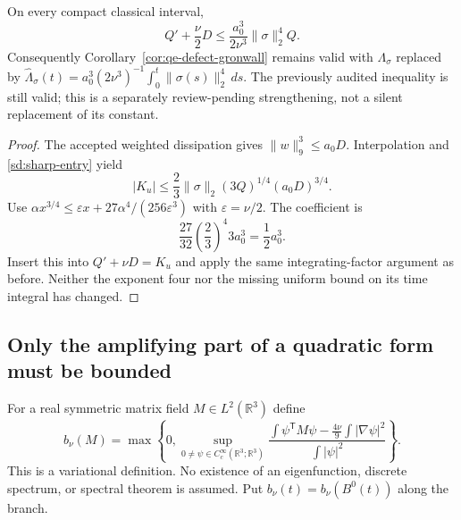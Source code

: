 \begin{proposition}
\label{sd:improved}
On every compact classical interval,
\begin{equation}\label{sd:improved-diff}
 Q'+\frac\nu2D\le\frac{a_0^3}{2\nu^3}\|\sigma\|_2^4Q.
\end{equation}
Consequently Corollary~\ref{cor:qe-defect-gronwall} remains valid with
$\Lambda_\sigma$ replaced by
$\widehat\Lambda_\sigma(t)=a_0^3(2\nu^3)^{-1}
\int_0^t\|\sigma(s)\|_2^4\,ds$.
The previously audited inequality is still valid; this is a separately
review-pending strengthening, not a silent replacement of its constant.
\end{proposition}
\begin{proof}
The accepted weighted dissipation gives $\|w\|_9^3\le a_0D$.
Interpolation and \eqref{sd:sharp-entry} yield
\[
 |K_u|\le\frac23\|\sigma\|_2(3Q)^{1/4}(a_0D)^{3/4}.
\]
Use $\alpha x^{3/4}\le\varepsilon x+
27\alpha^4/(256\varepsilon^3)$ with $\varepsilon=\nu/2$.
The coefficient is
\[
 \frac{27}{32}\left(\frac23\right)^4 3a_0^3
 =\frac12a_0^3.
\]
Insert this into $Q'+\nu D=K_u$ and apply the same integrating-factor
argument as before. Neither the exponent four nor the missing uniform
bound on its time integral has changed.
\end{proof}

\subsection{Only the amplifying part of a quadratic form must be bounded}

For a real symmetric matrix field $M\in L^2(\mathbb R^3)$ define
\begin{equation}\label{sd:form-definition}
 b_\nu(M)=\max\left\{0,\sup_{0\ne\psi\in C_c^\infty(\mathbb R^3;\mathbb R^3)}
 \frac{\displaystyle\int\psi^{\mathsf T}M\psi
       -\frac{4\nu}{9}\int|\nabla\psi|^2}
      {\displaystyle\int|\psi|^2}\right\}.
\end{equation}
This is a variational definition. No existence of an eigenfunction,
discrete spectrum, or spectral theorem is assumed. Put
$b_\nu(t)=b_\nu(B^0(t))$ along the branch.

